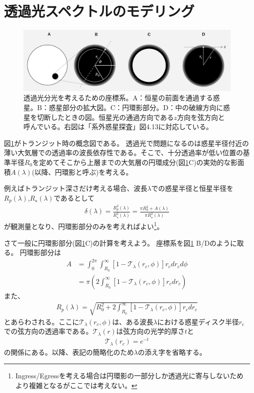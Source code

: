 \section{透過光スペクトルのモデリング}

\begin{figure}[htb]
\begin{center}
\includegraphics[width=0.85\linewidth]{fig/transmission_chord.PNG}
\caption{透過光分光を考えるための座標系。A：恒星の前面を通過する惑星。B：惑星部分の拡大図。C：円環影部分。D：中の破線方向に惑星を切断したときの図。恒星光の通過方向である$z$方向を弦方向と呼んでいる。右図は「系外惑星探査」図4.13に対応している。\label{fig:transmission_chord}}
\end{center}
\end{figure}

図\ref{fig:transmission_chord}がトランジット時の概念図である。
透過光で問題になるのは惑星半径付近の薄い大気層での透過率の波長依存性である。そこで、十分透過率が低い位置の基準半径$R_0$を定めてそこから上層までの大気層の円環成分(図\ref{fig:transmission_chord}C)の実効的な影面積$A(\lambda)$(以降、円環影と呼ぶ)を考える。


例えばトランジット深さだけ考える場合、波長$\lambda$での惑星半径と恒星半径を$R_p(\lambda)$,$R_\star(\lambda)$であるとして
\begin{align}
\delta(\lambda) = \frac{R_p^2(\lambda)}{R_\star^2(\lambda)}  = \frac{\pi R_0^2 + A(\lambda) }{\pi R_\star^2(\lambda)}    
\end{align}
が観測量となり、円環影部分のみを考えればよい\footnote{Ingress/Egressを考える場合は円環影の一部分しか透過光に寄与しないためより複雑となるがここでは考えない。}。



さて一般に円環影部分(図\ref{fig:transmission_chord}C)の計算を考えよう。
座標系を図\ref{fig:transmission_chord} B/Dのように取る。
円環影部分は
\begin{align}
A &= \int_0^{2 \pi} \int_{R_0}^\infty [ 1 - \mathcal{T}_\lambda(r_c, \phi)] r_c d r_c d\phi \nonumber \\
&= \pi \left( 2 \int_{R_0}^\infty [ 1 - \mathcal{T}_\lambda(r_c, \phi)] r_c d r_c  \right)
\end{align}
また、
\begin{align}
    \label{eq:rp_trans}
    R_p(\lambda) = \sqrt{ R_0^2 + 2 \int_{R_0}^\infty [ 1 - \mathcal{T}_\lambda(r_c, \phi)] r_c d r_c }
\end{align}
とあらわされる。ここに$\mathcal{T}_\lambda(r_c, \phi)$は、ある波長$\lambda$における惑星ディスク半径$r_c$での弦方向の透過率である。$\mathcal{T}_\lambda(r)$は弦方向の光学的厚さ$t$と
\begin{align}
  \mathcal{T}_\lambda(r_c) = e^{-t}
\end{align}
の関係にある。以降、表記の簡略化のため$\lambda$の添え字を省略する。

